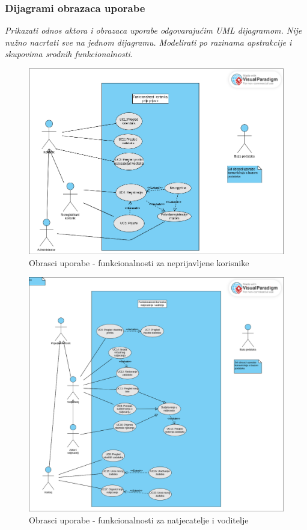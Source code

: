				
					
				\subsubsection{Dijagrami obrazaca uporabe}
					
					\textit{Prikazati odnos aktora i obrazaca uporabe odgovarajućim UML dijagramom. Nije nužno nacrtati sve na jednom dijagramu. Modelirati po razinama apstrakcije i skupovima srodnih funkcionalnosti.}
					
					\begin{figure}[H]
						\includegraphics[scale=0.4]{dijagrami/obrasci_uporabe1.png} 
						\centering
						\caption{Obrasci uporabe - funkcionalnosti za neprijavljene korisnike}
						\label{fig:obrasci_uporabe1}
					\end{figure}
					
					\begin{figure}[H]
						\includegraphics[scale=0.4]{dijagrami/obrasci_uporabe2.png} 
						\centering
						\caption{Obrasci uporabe - funkcionalnosti za natjecatelje i voditelje}
						\label{fig:obrasci_uporabe2}
					\end{figure}
					
